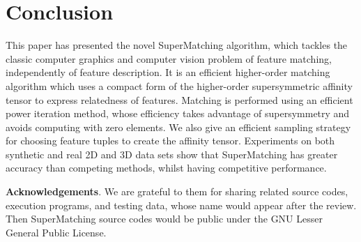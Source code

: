 \section{Conclusion}
\label{sec:conclusion}

This paper has presented the novel SuperMatching algorithm,
which tackles the classic computer graphics and computer vision problem of feature matching, independently of feature description.
It is an efficient higher-order matching algorithm which uses a compact form of the higher-order supersymmetric affinity tensor to express relatedness of features.
Matching is performed using an efficient power iteration method, whose efficiency takes advantage of supersymmetry and avoids computing with zero elements.
We also give an efficient sampling strategy for choosing feature tuples to create the affinity tensor.
Experiments on both synthetic and real 2D and 3D data sets show that
SuperMatching has greater accuracy than competing methods, whilst having competitive performance.


\textbf{Acknowledgements}. We are grateful to them for sharing related source codes, execution programs, and testing data, whose name would appear after the review.
Then SuperMatching source codes would be public under the GNU Lesser General Public License.

